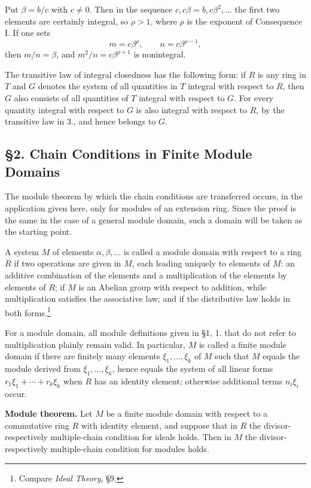 \documentclass[11pt]{article}
\begin{document}
Put $\beta=b/c$ with $c\ne0$. Then in the sequence
$c,c\beta=b,c\beta^2,\ldots$ the first two elements are certainly integral, so
$\rho>1$, where $\rho$ is the exponent of Consequence I. If one sets
\[
        m=c\beta^\rho,\qquad n=c\beta^{\rho-1},
\]
then $m/n=\beta$, and $m^2/n=c\beta^{\rho+1}$ is nonintegral.

The transitive law of integral closedness has the following form: if $R$ is any
ring in $T$ and $G$ denotes the system of all quantities in $T$ integral with respect
to $R$, then $G$ also consists of all quantities of $T$ integral with respect to $G$.
For every quantity integral with respect to $G$ is also integral with respect to $R$,
by the transitive law in 3., and hence belongs to $G$.

\subsection*{§2. Chain Conditions in Finite Module Domains}

The module theorem by which the chain conditions are transferred occurs, in the
application given here, only for modules of an extension ring. Since the proof is
the same in the case of a general module domain, such a domain will be taken as
the starting point.

A system $M$ of elements $\alpha,\beta,\ldots$ is called a module domain with
respect to a ring $R$ if two operations are given in $M$, each leading uniquely to
elements of $M$: an additive combination of the elements and a multiplication of
the elements by elements of $R$; if $M$ is an Abelian group with respect to addition,
while multiplication satisfies the associative law; and if the distributive law holds
in both forms.\footnote{Compare \emph{Ideal Theory}, §9.}

For a module domain, all module definitions given in §1, 1. that do not refer to
multiplication plainly remain valid. In particular, $M$ is called a finite module
domain if there are finitely many elements $\xi_1,\ldots,\xi_k$ of $M$ such that
$M$ equals the module derived from $\xi_1,\ldots,\xi_k$, hence equals the system
of all linear forms $r_1\xi_1+\cdots+r_k\xi_k$ when $R$ has an identity element;
otherwise additional terms $n_i\xi_i$ occur.

\medskip
\noindent\textbf{Module theorem.} Let $M$ be a finite module domain with respect
to a commutative ring $R$ with identity element, and suppose that in $R$ the
divisor- respectively multiple-chain condition for ideals holds. Then in $M$ the
divisor- respectively multiple-chain condition for modules holds.
\end{document}
